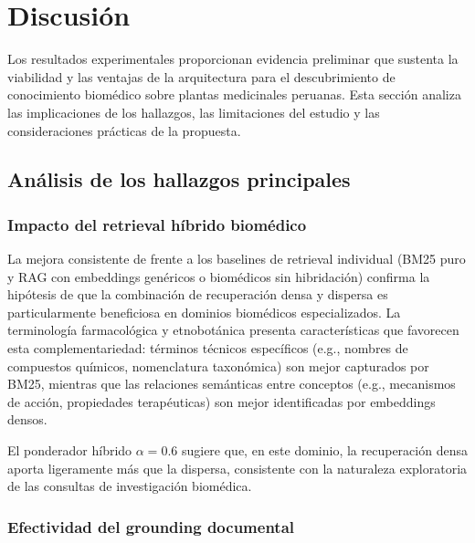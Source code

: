 
\section{Discusión}
\label{sec:discussion}

Los resultados experimentales proporcionan evidencia preliminar que sustenta la viabilidad y las ventajas de la arquitectura \sirca{} para el descubrimiento de conocimiento biomédico sobre plantas medicinales peruanas. Esta sección analiza las implicaciones de los hallazgos, las limitaciones del estudio y las consideraciones prácticas de la propuesta.

\subsection{Análisis de los hallazgos principales}
\label{subsec:disc_findings}

\subsubsection{Impacto del retrieval híbrido biomédico}

La mejora consistente de \sirca{} frente a los baselines de retrieval individual (BM25 puro y RAG con embeddings genéricos o biomédicos sin hibridación) confirma la hipótesis de que la combinación de recuperación densa y dispersa es particularmente beneficiosa en dominios biomédicos especializados. La terminología farmacológica y etnobotánica presenta características que favorecen esta complementariedad: términos técnicos específicos (e.g., nombres de compuestos químicos, nomenclatura taxonómica) son mejor capturados por BM25, mientras que las relaciones semánticas entre conceptos (e.g., mecanismos de acción, propiedades terapéuticas) son mejor identificadas por embeddings densos.

El ponderador híbrido $\alpha = 0.6$ sugiere que, en este dominio, la recuperación densa aporta ligeramente más que la dispersa, consistente con la naturaleza exploratoria de las consultas de investigación biomédica.

\subsubsection{Efectividad del grounding documental}

